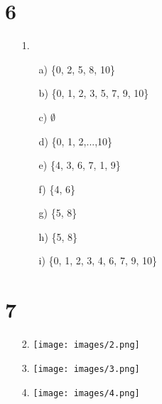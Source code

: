 \documentclass[sigconf]{article}
\begin{document}
\section*{6}
\begin{itemize}
  \item[1.] \begin{itemize}
    \item[a)] \{0, 2, 5, 8, 10\}
    \item[b)] \{0, 1, 2, 3, 5, 7, 9, 10\}
    \item[c)] $\emptyset$
    \item[d)] \{0, 1, 2,...,10\}
    \item[e)] \{4, 3, 6, 7, 1, 9\}
    \item[f)] \{4, 6\}
    \item[g)] \{5, 8\}
    \item[h)] \{5, 8\}
    \item[i)] \{0, 1, 2, 3, 4, 6, 7, 9, 10\}
    \end{itemize}
\end{itemize}

\section*{7}
\begin{itemize}
  \item[2.] \texttt{[image: images/2.png]}
  \item[3.] \texttt{[image: images/3.png]}
  \item[4.] \texttt{[image: images/4.png]}
\end{itemize}



\end{document}
